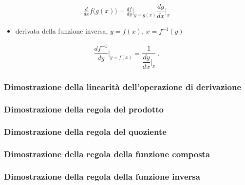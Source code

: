 \documentclass[letterpaper,10pt,english]{jupyterBook}
\begin{document}
\begin{equation}\label{equation:ch/infinitesimal_calculus/derivatives:infinitesimal-calculus:derivatives:rules:composite}
\begin{split}\frac{d}{dx} f\big( g(x) \big) = \frac{d f}{dy}\Big|_{y=g(x)} \dfrac{d g}{d x}\Big|_{x}\end{split}
\end{equation}\begin{itemize}
\item {} 
\sphinxAtStartPar
derivata della funzione inversa, \(y = f(x)\), \(x = f^{-1}(y)\)

\end{itemize}
\begin{equation}\label{equation:ch/infinitesimal_calculus/derivatives:infinitesimal-calculus:derivatives:rules:inverse}
\begin{split} \dfrac{d f^{-1}}{d y}\bigg|_{y = f(x)} = \dfrac{1}{ \dfrac{d y}{d x}\bigg|_{x}} \ .\end{split}
\end{equation}\subsubsection*{Dimostrazione della linearità dell’operazione di derivazione}

\sphinxAtStartPar
{}
\subsubsection*{Dimostrazione della regola del prodotto}

\sphinxAtStartPar
{}
\subsubsection*{Dimostrazione della regola del quoziente}

\sphinxAtStartPar
{}
\subsubsection*{Dimostrazione della regola della funzione composta}

\sphinxAtStartPar
{}
\subsubsection*{Dimostrazione della regola della funzione inversa}
\end{document}
